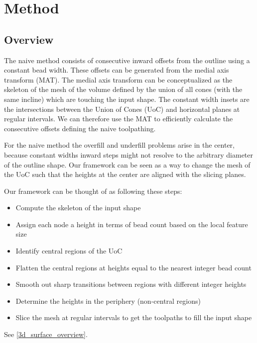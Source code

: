 \section{Method}
\subsection{Overview}
The naive method consists of consecutive inward offsets from the outline using a constant bead width.
These offsets can be generated from the medial axis transform (MAT).
The medial axis transform can be conceptualized as the skeleton of the mesh of the volume defined by the union of all cones (with the same incline) which are touching the input shape. \cite{blum1967transformation}
The constant width insets are the intersections between the Union of Cones (UoC) and horizontal planes at regular intervals.
We can therefore use the MAT to efficiently calculate the consecutive offsets defining the naive toolpathing. \cite{eiamsa2003toward}

For the naive method the overfill and underfill problems arise in the center,
because constant widths inward steps might not resolve to the arbitrary diameter of the outline shape.
Our framework can be seen as a way to change the mesh of the UoC such that the heights at the center are aligned with the slicing planes.

Our framework can be thought of as following these steps:
\begin{itemize}
\item Compute the skeleton of the input shape
\item Assign each node a height in terms of bead count based on the local feature size
\item Identify central regions of the UoC
\item Flatten the central regions at heights equal to the nearest integer bead count
\item Smooth out sharp transitions between regions with different integer heights
\item Determine the heights in the periphery (non-central regions)
\item Slice the mesh at regular intervals to get the toolpaths to fill the input shape
\end{itemize}
See \cref{3d_surface_overview}.






